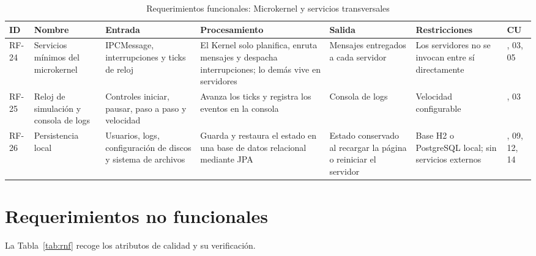 \documentclass[conference]{IEEEtran}
\begin{document}
\begin{table}[!t]
\caption{Requerimientos funcionales: Microkernel y servicios transversales}
\label{tab:rf-nucleo}
\footnotesize\renewcommand{\arraystretch}{1.1}\setlength{\tabcolsep}{2pt}
\begin{tabular}{|>{\raggedright\arraybackslash}p{0.95cm}|>{\raggedright\arraybackslash}p{2.3cm}|>{\raggedright\arraybackslash}p{3.2cm}|>{\raggedright\arraybackslash}p{3.9cm}|>{\raggedright\arraybackslash}p{2.8cm}|>{\raggedright\arraybackslash}p{2.8cm}|>{\raggedright\arraybackslash}p{0.95cm}|}
\hline
\textbf{ID} & \textbf{Nombre} & \textbf{Entrada} & \textbf{Procesamiento} & \textbf{Salida} & \textbf{Restricciones} & \textbf{CU}\\ \hline
RF-24 & Servicios mínimos del microkernel & IPCMessage, interrupciones y ticks de reloj & El Kernel solo planifica, enruta mensajes y despacha interrupciones; lo demás vive en servidores & Mensajes entregados a cada servidor & Los servidores no se invocan entre sí directamente & 01, 03, 05\\ \hline
RF-25 & Reloj de simulación y consola de logs & Controles iniciar, pausar, paso a paso y velocidad & Avanza los ticks y registra los eventos en la consola & Consola de logs & Velocidad configurable & 02, 03\\ \hline
RF-26 & Persistencia local & Usuarios, logs, configuración de discos y sistema de archivos & Guarda y restaura el estado en una base de datos relacional mediante JPA & Estado conservado al recargar la página o reiniciar el servidor & Base H2 o PostgreSQL local; sin servicios externos & 08, 09, 12, 14\\ \hline
\end{tabular}
\end{table}

\clearpage
\section{Requerimientos no funcionales}\label{ax:rnf}
La Tabla~\ref{tab:rnf} recoge los atributos de calidad y su verificación.
\end{document}
